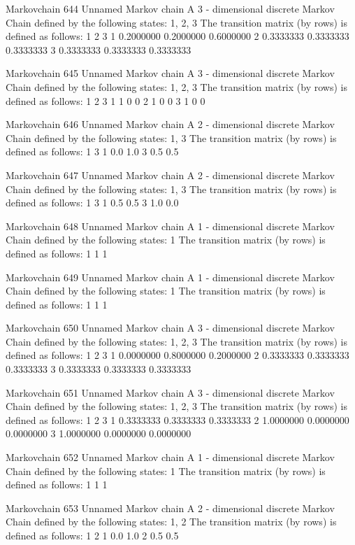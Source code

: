 \documentclass[
  nojss]{jss}
\begin{document}
\begin{CodeChunk}
\begin{CodeOutput}
Markovchain  644 
Unnamed Markov chain 
 A  3 - dimensional discrete Markov Chain defined by the following states: 
 1, 2, 3 
 The transition matrix  (by rows)  is defined as follows: 
          1         2         3
1 0.2000000 0.2000000 0.6000000
2 0.3333333 0.3333333 0.3333333
3 0.3333333 0.3333333 0.3333333

Markovchain  645 
Unnamed Markov chain 
 A  3 - dimensional discrete Markov Chain defined by the following states: 
 1, 2, 3 
 The transition matrix  (by rows)  is defined as follows: 
  1 2 3
1 1 0 0
2 1 0 0
3 1 0 0

Markovchain  646 
Unnamed Markov chain 
 A  2 - dimensional discrete Markov Chain defined by the following states: 
 1, 3 
 The transition matrix  (by rows)  is defined as follows: 
    1   3
1 0.0 1.0
3 0.5 0.5

Markovchain  647 
Unnamed Markov chain 
 A  2 - dimensional discrete Markov Chain defined by the following states: 
 1, 3 
 The transition matrix  (by rows)  is defined as follows: 
    1   3
1 0.5 0.5
3 1.0 0.0

Markovchain  648 
Unnamed Markov chain 
 A  1 - dimensional discrete Markov Chain defined by the following states: 
 1 
 The transition matrix  (by rows)  is defined as follows: 
  1
1 1

Markovchain  649 
Unnamed Markov chain 
 A  1 - dimensional discrete Markov Chain defined by the following states: 
 1 
 The transition matrix  (by rows)  is defined as follows: 
  1
1 1

Markovchain  650 
Unnamed Markov chain 
 A  3 - dimensional discrete Markov Chain defined by the following states: 
 1, 2, 3 
 The transition matrix  (by rows)  is defined as follows: 
          1         2         3
1 0.0000000 0.8000000 0.2000000
2 0.3333333 0.3333333 0.3333333
3 0.3333333 0.3333333 0.3333333

Markovchain  651 
Unnamed Markov chain 
 A  3 - dimensional discrete Markov Chain defined by the following states: 
 1, 2, 3 
 The transition matrix  (by rows)  is defined as follows: 
          1         2         3
1 0.3333333 0.3333333 0.3333333
2 1.0000000 0.0000000 0.0000000
3 1.0000000 0.0000000 0.0000000

Markovchain  652 
Unnamed Markov chain 
 A  1 - dimensional discrete Markov Chain defined by the following states: 
 1 
 The transition matrix  (by rows)  is defined as follows: 
  1
1 1

Markovchain  653 
Unnamed Markov chain 
 A  2 - dimensional discrete Markov Chain defined by the following states: 
 1, 2 
 The transition matrix  (by rows)  is defined as follows: 
    1   2
1 0.0 1.0
2 0.5 0.5


\end{CodeOutput}
\end{CodeChunk}
\end{document}
